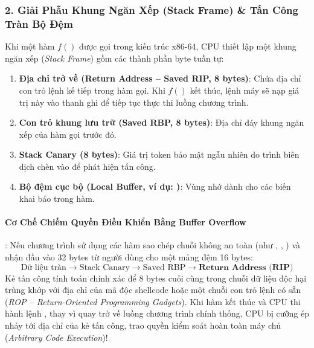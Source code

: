 \subsubsection{2. Giải Phẫu Khung Ngăn Xếp (Stack Frame) \& Tấn Công Tràn Bộ Đệm}
Khi một hàm $f()$ được gọi trong kiến trúc x86-64, CPU thiết lập một khung ngăn xếp (\textit{Stack Frame}) gồm các thành phần byte tuần tự:
\begin{enumerate}
  \item \textbf{Địa chỉ trở về (Return Address -- Saved RIP, 8 bytes)}: Chứa địa chỉ con trỏ lệnh kế tiếp trong hàm gọi. Khi $f()$ kết thúc, lệnh máy  sẽ nạp giá trị này vào thanh ghi  để tiếp tục thực thi luồng chương trình.
  \item \textbf{Con trỏ khung lưu trữ (Saved RBP, 8 bytes)}: Địa chỉ đáy khung ngăn xếp của hàm gọi trước đó.
  \item \textbf{Stack Canary (8 bytes)}: Giá trị token bảo mật ngẫu nhiên do trình biên dịch chèn vào để phát hiện tấn công.
  \item \textbf{Bộ đệm cục bộ (Local Buffer, ví dụ: )}: Vùng nhớ dành cho các biến khai báo trong hàm.
\end{enumerate}

\paragraph{Cơ Chế Chiếm Quyền Điều Khiển Bằng Buffer Overflow}:
Nếu chương trình sử dụng các hàm sao chép chuỗi không an toàn (như , , ) và nhận đầu vào 32 bytes từ người dùng cho một mảng đệm 16 bytes:
\begin{equation}
\text{Dữ liệu tràn} \longrightarrow \text{Stack Canary} \longrightarrow \text{Saved RBP} \longrightarrow \mathbf{\text{Return Address (RIP)}}
\end{equation}
Kẻ tấn công tính toán chính xác để 8 bytes cuối cùng trong chuỗi dữ liệu độc hại trùng khớp với địa chỉ của mã độc shellcode hoặc một chuỗi con trỏ lệnh có sẵn (\textit{ROP -- Return-Oriented Programming Gadgets}). Khi hàm kết thúc và CPU thi hành lệnh , thay vì quay trở về luồng chương trình chính thống, CPU bị cưỡng ép nhảy tới địa chỉ của kẻ tấn công, trao quyền kiểm soát hoàn toàn máy chủ (\textit{Arbitrary Code Execution})!

